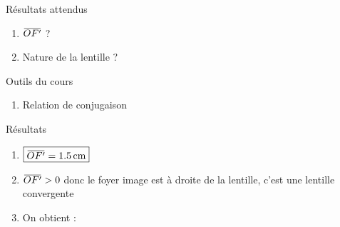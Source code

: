 \documentclass[10pt,a5paper,notitlepage]{book}
\begin{document}
\begin{NCprop}{Résultats attendus}
	\begin{enumerate}
		\item $\OF$ ?
		\item Nature de la lentille ?
	\end{enumerate}
\end{NCprop}

\begin{NCdemo}{Outils du cours}
	\begin{enumerate}
		\item Relation de conjugaison
	\end{enumerate} 
\end{NCdemo}

\begin{NCexem}{Résultats}
	\begin{enumerate}
		\item $\boxed{\OF = 1.5\,{\rm cm}}$
        \item $\OF > 0$ donc le foyer image est à droite de la lentille, c'est
            une lentille convergente
		\item On obtient :
            \begin{center}
\end{center}
\end{enumerate}
\end{NCexem}
\end{document}
